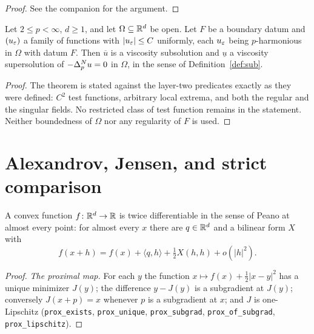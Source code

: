 \begin{proof}
\leanok
{}
See the companion for the argument.
\end{proof}


\begin{theorem}\label{thm:main4}
\leanok
Let $2 \le p < \infty$, $d \ge 1$, and let $\Omega \subseteq \mathbb{R}^d$ be open.
Let $F$ be a boundary datum and $(u_\varepsilon)$ a family of functions with
$\left\lvert u_\varepsilon\right\rvert \le C$ uniformly, each $u_\varepsilon$ being $p$-harmonious in $\Omega$
with datum $F$. Then $\overline{u}$ is a viscosity subsolution and
$\underline{u}$ a viscosity supersolution of $-\Delta_p^{N} u = 0$ in $\Omega$, in
the sense of Definition~\ref{def:sub}.
\end{theorem}

\begin{proof}
\leanok
{}
The theorem is stated against the layer-two predicates exactly as they were
defined: $C^2$ test functions, arbitrary local extrema, and both the regular
and the singular fields. No restricted class of test function remains in the
statement. Neither boundedness of $\Omega$ nor any regularity of $F$ is used.
\end{proof}


\chapter{Alexandrov, Jensen, and strict comparison}

\begin{theorem}\label{thm:alexandrov}
\leanok
A convex function $f\colon \mathbb{R}^d \to \mathbb{R}$ is twice differentiable in the sense of
Peano at almost every point: for almost every $x$ there are $q \in \mathbb{R}^d$ and a
bilinear form $X$ with
\[
  f(x + h) = f(x) + \langle q, h\rangle + \tfrac12 X(h, h) + o(|h|^2).
\]
\end{theorem}

\begin{proof}
\leanok
\emph{The proximal map.} For each $y$ the function
$x \mapsto f(x) + \tfrac12 |x - y|^2$ has a unique minimizer $J(y)$; the
difference $y - J(y)$ is a subgradient at $J(y)$; conversely $J(x + p) = x$
whenever $p$ is a subgradient at $x$; and $J$ is one-Lipschitz
(\texttt{prox\_exists}, \texttt{prox\_unique}, \texttt{prox\_subgrad},
\texttt{prox\_of\_subgrad}, \texttt{prox\_lipschitz}).
\end{proof}


